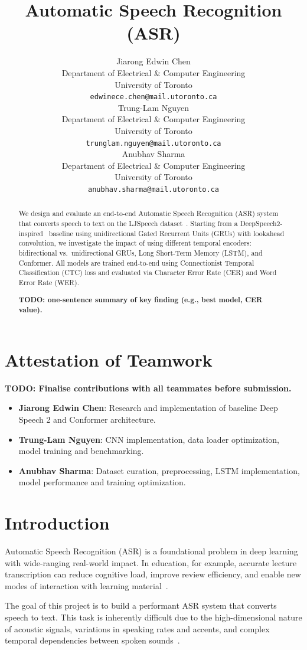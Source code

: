 \documentclass{article}
\title{Automatic Speech Recognition (ASR)}
\author{%
  Jiarong Edwin Chen\\
  Department of Electrical \& Computer Engineering\\
  University of Toronto\\
  \texttt{edwinece.chen@mail.utoronto.ca} \\
  \And
  Trung-Lam Nguyen\\
  Department of Electrical \& Computer Engineering\\
  University of Toronto\\
  \texttt{trunglam.nguyen@mail.utoronto.ca} \\
  \And
  Anubhav Sharma\\
  Department of Electrical \& Computer Engineering\\
  University of Toronto\\
  \texttt{anubhav.sharma@mail.utoronto.ca} \\
}
\begin{document}
\maketitle


\begin{abstract}
We design and evaluate an end-to-end Automatic Speech Recognition (ASR) system that converts speech to text on the LJSpeech dataset~\cite{ljspeech17}. Starting from a DeepSpeech2-inspired~\cite{amodei2016deep} baseline using unidirectional Gated Recurrent Units (GRUs) with lookahead convolution, we investigate the impact of using different temporal encoders: bidirectional vs.\ unidirectional GRUs, Long Short-Term Memory (LSTM), and Conformer. All models are trained end-to-end using Connectionist Temporal Classification (CTC) loss and evaluated via Character Error Rate (CER) and Word Error Rate (WER). 

\textbf{TODO: one-sentence summary of key finding (e.g., best model, CER value).}
\end{abstract}

\section*{Attestation of Teamwork}
\textbf{TODO: Finalise contributions with all teammates before submission.}
\begin{itemize}
    \item \textbf{Jiarong Edwin Chen}: Research and implementation of baseline Deep Speech 2 and Conformer architecture.
    \item \textbf{Trung-Lam Nguyen}: CNN implementation, data loader optimization, model training and benchmarking.
    \item \textbf{Anubhav Sharma}: Dataset curation, preprocessing, LSTM implementation, model performance and training optimization.
\end{itemize}

\section{Introduction}
Automatic Speech Recognition (ASR) is a foundational problem in deep learning with wide-ranging real-world impact. In education, for example, accurate lecture transcription can reduce cognitive load, improve review efficiency, and enable new modes of interaction with learning material~\cite{grandview2025speech}.

The goal of this project is to build a performant ASR system that converts speech to text. This task is inherently difficult due to the high-dimensional nature of acoustic signals, variations in speaking rates and accents, and complex temporal dependencies between spoken sounds~\cite{zambreno2025evaluating}.
\end{document}
